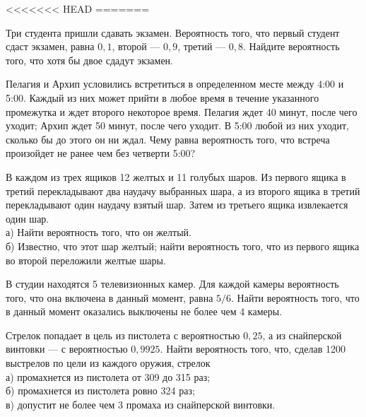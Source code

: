 <<<<<<< HEAD
=======


\begin{zkrW}{20}\noindent 
	Три студента пришли сдавать экзамен. Вероятность того, что первый студент сдаст экзамен, равна $0{,}1$, второй --- $0{,}9$, третий --- $0{,}8$. Найдите вероятность того, что хотя бы двое сдадут экзамен.
 
\end{zkrW}

\begin{zkrW}{20}\noindent 
	Пелагия и Архип условились встретиться в определенном месте между 4:00 и 5:00. Каждый из них может прийти в любое время в течение указанного промежутка и ждет второго некоторое время. Пелагия ждет 40 минут, после чего уходит; Архип ждет 50 минут, после чего уходит. В 5:00 любой из них уходит, сколько бы до этого он ни ждал. Чему равна вероятность того, что встреча произойдет не ранее чем без четверти 5:00?
 
\end{zkrW}

\begin{zkrW}{20}\noindent 
	В каждом из трех ящиков 12 желтых и 11 голубых шаров. Из первого ящика в третий перекладывают два наудачу выбранных шара, а из второго ящика в третий перекладывают один наудачу взятый шар. Затем из третьего ящика извлекается один шар. \\ \indent а) Найти вероятность того, что он желтый. \\ \indent б) Известно, что этот шар желтый; найти вероятность того, что из первого ящика во второй переложили желтые шары.
 
\end{zkrW}

\begin{zkrW}{20}\noindent 
	В студии находятся 5 телевизионных камер. Для каждой камеры вероятность того, что она включена в данный момент, равна $5/6$. Найти вероятность того, что в данный момент оказались выключены не более чем 4 камеры.
 
\end{zkrW}

\begin{zkrW}{20}\noindent 
	Стрелок попадает в цель из пистолета с вероятностью $0{,}25$, а из снайперской винтовки --- с вероятностью $0{,}9925$. Найти вероятность того, что, сделав 1200 выстрелов по цели из каждого оружия, стрелок \\ \indent а) промахнется из пистолета от 309 до 315 раз; \\ \indent б) промахнется из пистолета ровно 324 раз; \\ \indent в) допустит не более чем 3 промаха из снайперской винтовки.
 
\end{zkrW}

